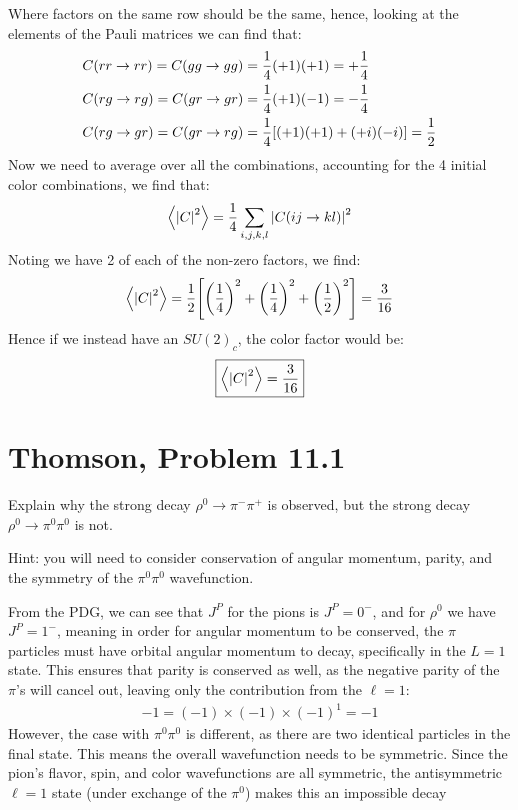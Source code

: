\documentclass[12pt]{article}
\begin{document}
Where factors on the same row should be the same, hence, looking at the elements of the Pauli matrices we can find that:
\begin{align*}
  C(rr\to rr)=C(gg\to gg)&=\frac14(+1)(+1)=+\frac14\\
  C(rg\to rg)=C(gr\to gr)&=\frac14(+1)(-1)=-\frac14\\
  C(rg\to gr)=C(gr\to rg)&=\frac14\qty[(+1)(+1)+(+i)(-i)]=\frac12
\end{align*}
Now we need to average over all the combinations, accounting for the 4 initial color combinations, we find that:
\begin{align*}
  \ev{\abs{C}^2}=\frac14\sum_{i,j,k,l}\abs{C(ij\to kl)}^2
\end{align*}
Noting we have 2 of each of the non-zero factors, we find:
\begin{align*}
  \ev{\abs{C}^2}=\frac12
  \qty[{\qty(\frac14)}^2+{\qty(\frac14)}^2+{\qty(\frac12)}^2]
  =\frac3{16}
\end{align*}
Hence if we instead have an ${SU(2)}_c$, the color factor would be:
\begin{equation}
  \label{eq:p1}
  \boxed{\ev{\abs{C}^2}=\frac3{16}}
\end{equation}
\newpage
\section{Thomson, Problem 11.1}
\begin{problem}
  Explain why the strong decay $\rho^0\to\pi^-\pi^+$ is observed, but the strong decay $\rho^0\to\pi^0\pi^0$ is not.

  Hint: you will need to consider conservation of angular momentum, parity, and the symmetry of the $\pi^0\pi^0$ wavefunction.
\end{problem}
From the PDG, we can see that $J^P$ for the pions is $J^P=0^-$, and for $\rho^0$ we have $J^P=1^-$, meaning in order for angular momentum to be conserved, the $\pi$ particles must have orbital angular momentum to decay, specifically in the $L=1$ state. This ensures that parity is conserved as well, as the negative parity of the $\pi$'s will cancel out, leaving only the contribution from the $\ell=1$:
\begin{align*}
  -1=(-1)\times(-1)\times{(-1)}^1=-1
\end{align*}
However, the case with $\pi^0\pi^0$ is different, as there are two identical particles in the final state. This means the overall wavefunction needs to be symmetric. Since the pion's flavor, spin, and color wavefunctions are all symmetric, the antisymmetric $\ell=1$ state (under exchange of the $\pi^0$) makes this an impossible decay
\newpage
\end{document}
